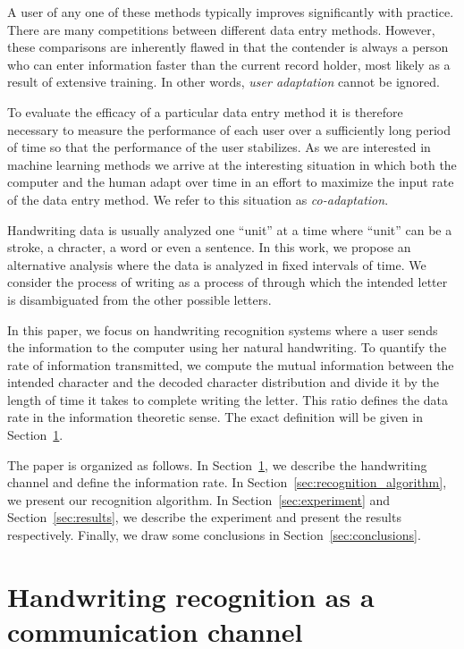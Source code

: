 \documentclass{sigchi}
\begin{document}
A user of any one of these methods typically improves significantly
with practice. There are many competitions between different data
entry methods. However, these comparisons are inherently flawed in
that the contender is always a person who can enter information faster
than the current record holder, most likely as a result of extensive
training. In other words, {\em user adaptation} cannot be ignored.

To evaluate the efficacy of a particular data entry method it is
therefore necessary to measure the performance of each user over a
sufficiently long period of time so that the performance of the user
stabilizes. As we are interested in machine learning methods we arrive
at the interesting situation in which both the computer and the human
adapt over time in an effort to maximize the input rate of the
data entry method. We refer to this situation as {\em co-adaptation}.
 
Handwriting data is usually analyzed one ``unit'' at a time where
``unit'' can be a stroke, a chracter, a word or even a
sentence. In this work, we propose an alternative analysis where the
data is analyzed in fixed intervals of time. We consider the process
of writing as a process of through which the intended letter is
disambiguated from the other possible letters. 

In this paper, we focus on handwriting recognition systems where a user
sends the information to the computer using her natural
handwriting. To quantify the rate of information transmitted, we
compute the mutual information between the intended character and the
decoded character distribution and divide it by the length of time it
takes to complete writing the letter. This ratio defines the data rate
in the information theoretic sense.  The exact definition will be
given in Section~\ref{sec:channel}.

The paper is organized as follows. In Section~\ref{sec:channel}, we
describe the handwriting channel and define the information rate. In
Section~\ref{sec:recognition_algorithm}, we present our recognition
algorithm. In Section~\ref{sec:experiment} and
Section~\ref{sec:results}, we describe the experiment and present the
results respectively. Finally, we draw some conclusions in
Section~\ref{sec:conclusions}.


\section{Handwriting recognition as a communication channel}
\label{sec:channel}
\end{document}
